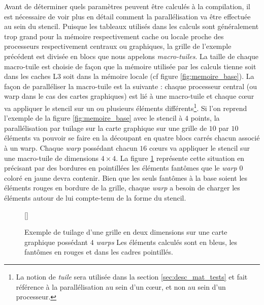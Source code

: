 Avant de déterminer quels paramètres peuvent être calculés à la compilation, il est nécessaire de voir plus en détail comment la parallélisation va être effectuée au sein du stencil. Puisque les tableaux utilisés dans les calculs sont généralement trop grand pour la mémoire respectivement cache ou locale proche des processeurs respectivement centraux ou graphiques, la grille de l'exemple précédent est divisée en blocs que nous appelons \emph{macro-tuiles}. La taille de chaque macro-tuile est choisie de façon que la mémoire utilisée par les calculs tienne soit dans les caches L3 soit dans la mémoire locale (cf figure \ref{fig:memoire_base}). La façon de paralléliser la macro-tuile est la suivante : chaque processeur central (ou warp dans le cas des cartes graphiques) est lié à une macro-tuile et chaque cœur va appliquer le stencil sur un ou plusieurs éléments différents\footnote{La notion de \emph{tuile} sera utilisée dans la section \ref{sec:desc_mat_tests} et fait référence à la parallélisation au sein d'un cœur, et non au sein d'un processeur.}. Si l'on reprend l'exemple de la figure \ref{fig:memoire_base} avec le stencil à $4$ points, la parallélisation par tuilage sur la carte graphique sur une grille de $10$ par $10$ éléments va pouvoir se faire en la découpant en quatre blocs carrés chacun associé à un warp. Chaque \emph{warp} possédant chacun $16$ cœurs va appliquer le stencil sur une macro-tuile de dimensions $4 \times 4$. La figure \ref{fig:stencil_mtile} représente cette situation en précisant par des bordures en pointillées les éléments fantômes que le \emph{warp} $0$ coloré en jaune devra contenir. Bien que les seuls fantômes à la base soient les éléments rouges en bordure de la grille, chaque \emph{warp} a besoin de charger les éléments autour de lui compte-tenu de la forme du stencil.

\begin{figure}[!h]
[\FBwidth]
{\caption{Exemple de tuilage d'une grille en deux dimensions sur une carte graphique possédant $4$ \emph{warps} Les éléments calculés sont en bleus, les fantômes en rouges et dans les cadres pointillés.}\label{fig:stencil_mtile}}
{}
\end{figure}

